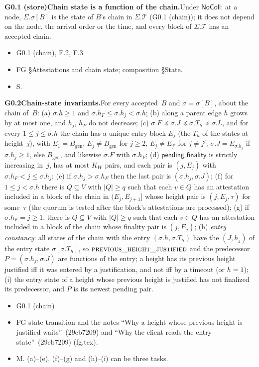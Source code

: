 \documentclass{article}
\newcommand{\genesis}{B_{\mathrm{gen}}}
\newcommand{\T}{\mathcal T}
\newcommand{\fname}[1]{\text{\textsc{#1}}}
\newcommand{\pendingFinality}{\mathsf{pending\_finality}}
\newcommand{\dagnode}[6]{%
\par\medskip\noindent\textbf{#1\enspace #2.}\enspace #3
\begin{itemize}[leftmargin=2.2em,itemsep=0pt,topsep=2pt]
\item[\emph{Uses}] #4
\item[\emph{Evid.}] #5
\item[\emph{Task}] #6
\end{itemize}}
\begin{document}
\dagnode{G0.1 (store)}{Chain state is a function of the chain}{Under
$\mathsf{NoColl}$: at a node, $\Sigma.\sigma[B]$ is the state of $B$'s chain
in $\Sigma.\T$ (G0.1 (chain)); it does not depend on the node, the arrival
order or the time, and every block of $\Sigma.\T$ has an accepted chain.}
{G0.1 (chain), F.2, F.3}{FG \S Attestations and chain state; composition
\S State.}{S.}

\dagnode{G0.2}{Chain-state invariants}{For every accepted~$B$ and
$\sigma=\sigma[B]$, about the chain of~$B$:
(a) $\sigma.h\geq1$ and $\sigma.h_F\leq\sigma.h_j<\sigma.h$;
(b) along a parent edge $h$ grows by at most one, and $h_j$, $h_F$ do not
decrease;
(c) $\sigma.F\preceq\sigma.J\preceq\sigma.T_h\preceq\sigma.L$, and for every
$1\leq j\leq\sigma.h$ the chain has a unique entry block $E_j$ (the $T_h$ of
the states at height~$j$), with $E_1=\genesis$, $E_j\neq\genesis$ for
$j\geq2$, $E_j\neq E_{j'}$ for $j\neq j'$; $\sigma.J=E_{\sigma.h_j}$ if
$\sigma.h_j\geq1$, else $\genesis$, and likewise $\sigma.F$ with $\sigma.h_F$;
(d) $\pendingFinality$ is strictly increasing in~$j$, has at most $K_W$
pairs, and each pair is $(j,E_j)$ with $\sigma.h_F<j\leq\sigma.h_j$;
(e) if $\sigma.h_j>\sigma.h_F$ then the last pair is $(\sigma.h_j,\sigma.J)$;
(f) for $1\leq j<\sigma.h$ there is $Q\subseteq V$ with $|Q|\geq q$ such that
each $v\in Q$ has an attestation included in a block of the chain in
$(E_j,E_{j+1}]$ whose height pair is $(j,E_j,\tau)$ for some~$\tau$ (the quorum
is tested after the block's attestations are processed);
(g) if $\sigma.h_F=j\geq1$, there is $Q\subseteq V$ with $|Q|\geq q$ such that
each $v\in Q$ has an attestation included in a block of the chain whose
finality pair is $(j,E_j)$;
(h) \emph{entry constancy}: all states of the chain with the entry
$(\sigma.h,\sigma.T_h)$ have the $(J,h_j)$ of the entry state
$\sigma[\sigma.T_h]$, so $\fname{previous\_height\_justified}$ and the predecessor
$P=(\sigma.h_j,\sigma.J)$ are functions of the entry; a height has its
previous height justified iff it was entered by a justification, and not iff
by a timeout (or $h=1$);
(i) the entry state of a height whose previous height is justified has not
finalized its predecessor, and
$P$ is its newest pending pair.}
{G0.1 (chain)}{FG state transition and the notes ``Why a height whose previous height is justified waits''~(29eb7209) and
``Why the client reads the entry state''~(29eb7209) (fg.tex).}{M.  (a)--(e), (f)--(g) and (h)--(i) can be three tasks.}
\end{document}
